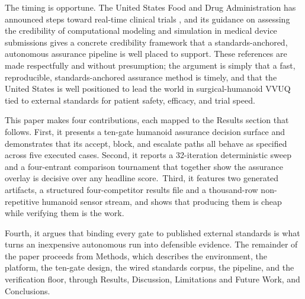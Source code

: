 The timing is opportune. The United States
Food and Drug Administration has announced steps toward real-time clinical trials
\cite{fda2026realtime}, and its guidance on assessing the credibility of
computational modeling and simulation in medical device submissions
\cite{fda2023credibility} gives a concrete credibility framework that a
standards-anchored, autonomous assurance pipeline is well placed to support.
These references are made respectfully and without presumption; the argument is
simply that a fast, reproducible, standards-anchored assurance method is timely,
and that the United States is well positioned to lead the world in
surgical-humanoid VVUQ tied to external standards for patient safety, efficacy,
and trial speed.

This paper makes four contributions, each mapped to the Results section that
follows. First, it presents a ten-gate humanoid assurance decision surface and
demonstrates that its accept, block, and escalate paths all behave as specified
across five executed cases. Second, it reports a 32-iteration deterministic sweep
and a four-entrant comparison tournament that together show the assurance overlay
is decisive over any headline score.\ Third, it features two generated
artifacts, a structured four-competitor results file and a thousand-row
non-repetitive humanoid sensor stream, and shows that producing them is cheap
while verifying them is the work. 

Fourth, it argues that binding every gate to
published external standards is what turns an inexpensive autonomous run into
defensible evidence. The remainder of the paper proceeds from Methods, which
describes the environment, the platform, the ten-gate design, the wired standards
corpus, the pipeline, and the verification floor, through Results, Discussion,
Limitations and Future Work, and Conclusions.


